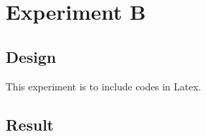 \section{Experiment B}

\subsection{Design}
This experiment is to include codes in Latex.

\subsection{Result}


